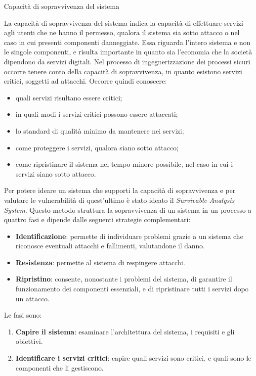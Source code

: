 \newpage
\begin{problem}{2.9}
Capacità di sopravvivenza del sistema
\end{problem}
\begin{solution}
La capacità di sopravvivenza del sistema indica la capacità di effettuare servizi agli utenti che ne hanno il permesso, qualora il sistema sia sotto attacco o nel caso in cui presenti componenti danneggiate.
Essa riguarda l'intero sistema e non le singole componenti, e risulta importante in quanto sia l'economia che la società dipendono da servizi digitali.
Nel processo di ingegnerizzazione dei processi sicuri occorre tenere conto della capacità di sopravvivenza, in quanto esistono servizi critici, soggetti ad attacchi.
Occorre quindi conoscere:
\begin{itemize}
	\item quali servizi risultano essere critici;
	\item in quali modi i servizi critici possono essere attaccati;
	\item lo standard di qualità minimo da mantenere nei servizi;
	\item come proteggere i servizi, qualora siano sotto attacco;
	\item come ripristinare il sistema nel tempo minore possibile, nel caso in cui i servizi siano sotto attacco.
\end{itemize}
Per potere ideare un sistema che supporti la capacità di sopravvivenza e per valutare le vulnerabilità di quest'ultimo è stato ideato il \textit{Survivable Analysis System}.
Questo metodo struttura la sopravvivenza di un sistema in un processo a quattro fasi e dipende dalle seguenti strategie complementari:
\begin{itemize}
	\item \textbf{Identificazione}: permette di individuare problemi grazie a un sistema che riconosce eventuali attacchi e fallimenti, valutandone il danno.
	\item \textbf{Resistenza}: permette al sistema di respingere attacchi.
	\item \textbf{Ripristino}: consente, nonostante i problemi del sistema, di garantire il funzionamento dei componenti essenziali, e di ripristinare tutti i servizi dopo un attacco.
\end{itemize}
Le fasi sono:
\begin{enumerate}
	\item \textbf{Capire il sistema}: esaminare l'architettura del sistema, i requisiti e gli obiettivi.
	\item \textbf{Identificare i servizi critici}: capire quali servizi sono critici, e quali sono le componenti che li gestiscono.

\end{enumerate}
\end{solution}
